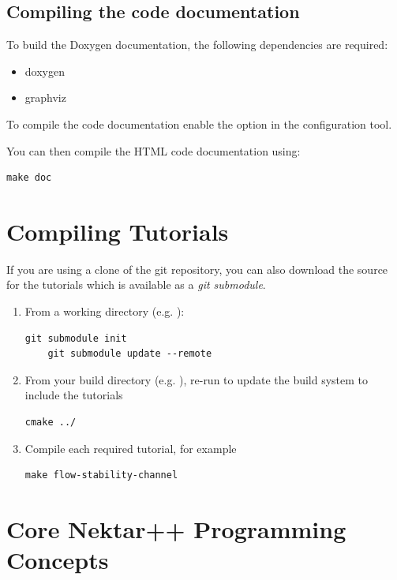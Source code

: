 \subsection{Compiling the code documentation}
To build the Doxygen documentation, the following dependencies are required:
\begin{itemize}
    \item doxygen
    \item graphviz
\end{itemize}

To compile the code documentation enable the  option
in the  configuration tool.

You can then compile the HTML code documentation using:
\begin{lstlisting}[style=BashInputStyle]
make doc
\end{lstlisting}


\section{Compiling Tutorials}
If you are using a clone of the \nekpp git repository, you can also download
the source for the \nekpp tutorials which is available as a \emph{git submodule}.

\begin{enumerate}
    \item From a \nekpp working directory (e.g. ):
    \begin{lstlisting}[style=BashInputStyle]
    git submodule init
    git submodule update --remote
    \end{lstlisting}
    \item From your build directory (e.g. ), re-run  to update the build system to include the tutorials
    \begin{lstlisting}[style=BashInputStyle]
    cmake ../
    \end{lstlisting}
    \item Compile each required tutorial, for example
    \begin{lstlisting}[style=BashInputStyle]
    make flow-stability-channel
    \end{lstlisting}
\end{enumerate}



\section{Core Nektar++ Programming Concepts}
\lstset{style=C++Style}

